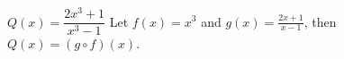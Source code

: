 {$Q(x) = \dfrac{2x^3+1}{x^3-1}$}
{Let $f(x) = x^3$ and $g(x)= \frac{2x+1}{x-1}$, then  $Q(x) =(g\circ f)(x)$.}